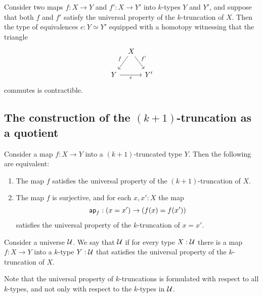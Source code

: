 \begin{cor}
  Consider two maps $f:X\to Y$ and $f':X\to Y'$ into $k$-types $Y$ and $Y'$, and suppose that both $f$ and $f'$ satisfy the universal property of the $k$-truncation of $X$. Then the type of equivalences $e:Y\simeq Y'$ equipped with a homotopy witnessing that the triangle
  \begin{equation*}
    \begin{tikzcd}[column sep=tiny]
      \phantom{Y'} & X \arrow[dl,swap,"f"] \arrow[dr,"{f'}"] \\
      Y \arrow[rr,swap,"e"] & & Y'
    \end{tikzcd}
  \end{equation*}
  commutes is contractible.
\end{cor}

\subsection{The construction of the  \texorpdfstring{$(k+1)$}{(k+1)}-truncation as a quotient}

\begin{thm}
  Consider a map $f:X\to Y$ into a $(k+1)$-truncated type $Y$. Then the following are equivalent:
  \begin{enumerate}
  \item The map $f$ satisfies the universal property of the $(k+1)$-truncation of $X$.
  \item The map $f$ is surjective, and for each $x,x':X$ the map
    \begin{equation*}
      \mathsf{ap}_{f} : (x=x')\to(f(x)=f(x'))
    \end{equation*}
    satisfies the universal property of the $k$-truncation of $x=x'$.
  \end{enumerate}
\end{thm}

\begin{defn}
  Consider a universe $\mathcal{U}$. We say that $\mathcal{U}$  if for every type $X:\mathcal{U}$ there is a map $f:X\to Y$ into a $k$-type $Y:\mathcal{U}$ that satisfies the universal property of the $k$-truncation of $X$.
\end{defn}

\begin{rmk}
  Note that the universal property of $k$-truncations is formulated with respect to all $k$-types, and not only with respect to the $k$-types in $\mathcal{U}$.
\end{rmk}

